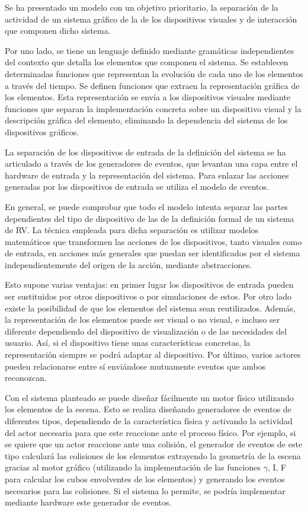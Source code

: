 \documentclass{egpubl}
\begin{document}
Se ha presentado un modelo con un objetivo prioritario, la separaci\'on de la actividad de 
un sistema gr\'afico de la de los dispositivos visuales y de interacci\'on 
que componen dicho sistema.

Por uno lado, se tiene un lenguaje definido mediante gram\'aticas
independientes del contexto que detalla los elementos que componen el
sistema. Se establecen determinadas funciones que representan la
evoluci\'on de cada uno de los elementos a trav\'es del tiempo. Se
definen funciones que extraen la representaci\'on gr\'afica de los
elementos. Esta representaci\'on se env\'ia a los dispositivos visuales
mediante funciones que separan la implementaci\'on concreta sobre un
dispositivo visual y la descripci\'on gr\'afica del elemento,
eliminando la dependencia del sistema de los dispositivos gr\'aficos.

La separaci\'on de los dispositivos de entrada de la
definici\'on del sistema se ha articulado a trav\'es de los generadores
de eventos, que levantan una capa entre el hardware de entrada y la
representaci\'on del sistema. Para enlazar las acciones generadas por
los dispositivos de entrada se utiliza el modelo de eventos.

En general, se puede comprobar que todo el modelo intenta separar las
partes dependientes del tipo de dispositivo de las de la definici\'on
formal de un sistema de RV. La t\'ecnica empleada para dicha
separaci\'on es utilizar modelos matem\'aticos que transformen las
acciones de los dispositivos, tanto visuales como de entrada, en
acciones m\'as generales que puedan ser identificados por el sistema
independientemente del origen de la acci\'on, mediante abstracciones.

Esto supone varias ventajas: en primer lugar los dispositivos de entrada pueden 
ser sustituidos por otros dispositivos o por simulaciones de estos. Por otro lado existe 
la posibilidad de que los elementos del sistema sean reutilizados. Adem\'as, la representaci\'on 
de los elementos puede ser visual o no visual, e incluso ser diferente 
dependiendo del dispositivo de visualizaci\'on o 
de las necesidades del usuario. As\'i, si el dispositivo tiene unas caracter\'isticas 
concretas, la representaci\'on siempre se podr\'a adaptar al dispositivo. Por \'ultimo, varios 
actores pueden relacionarse entre s\'i envi\'andose mutuamente eventos que ambos reconozcan.

Con el sistema planteado se puede dise\~nar f\'acilmente un motor f\'isico utilizando los 
elementos de la escena. Esto se realiza dise\~nando generadores de eventos de diferentes 
tipos, dependiendo de la caracter\'istica f\'isica y activando la actividad del actor 
necesaria para que este reaccione ante el proceso f\'isico. Por ejemplo, si se quiere 
que un actor reaccione ante una colisi\'on, el generador de eventos de este tipo calcular\'a 
las colisiones de los elementos extrayendo la geometr\'ia de la escena gracias al motor 
gr\'afico (utilizando la implementaci\'on de las funciones $\gamma$, I, F para calcular los cubos 
envolventes de los elementos) y generando los eventos necesarios para las colisiones. Si 
el sistema lo permite, se podr\'ia implementar mediante hardware este generador de eventos.
\end{document}
